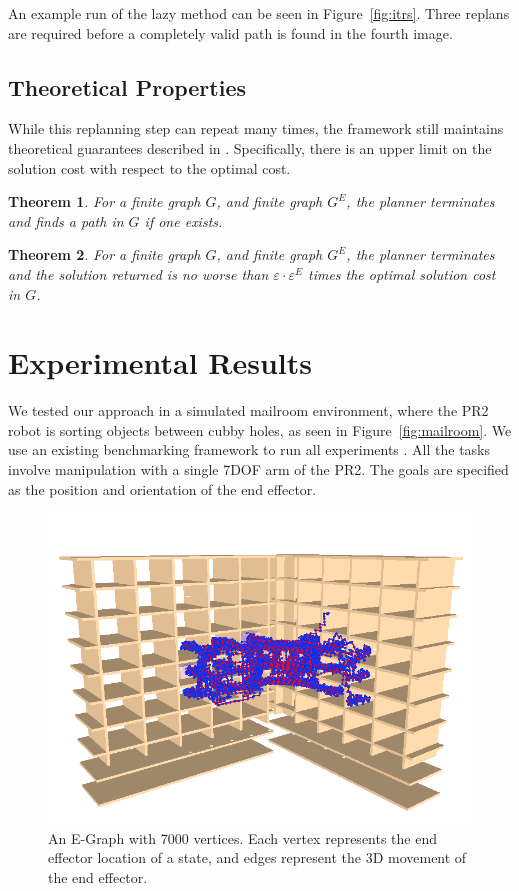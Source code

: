 \documentclass[letterpaper, 10 pt, conference]{ieeeconf}  %
\newtheorem{theorem}{Theorem}
\newcommand{\figref}[1]{Figure~\ref{fig:#1}}
\newcommand{\figlab}[1]{\label{fig:#1}}
\newcommand{\eeg}{\varepsilon^{E}}
\begin{document}
An example run of the lazy method can be seen in \figref{itrs}. Three
replans are required before a completely valid path is found in the fourth
image.

\subsection{Theoretical Properties}
While this replanning step can repeat many times, the framework still maintains
theoretical guarantees described in \cite{PhillipsRSS:2012}. Specifically, there
is an upper limit on the solution cost with respect to the optimal cost. 

\begin{theorem}
    \textit{For a finite graph $G$, and finite graph $G^E$, the planner
    terminates and finds a path in $G$ if one exists. }
\end{theorem}

\begin{theorem}
    \textit{For a finite graph $G$, and finite graph $G^E$, the planner
terminates and the solution returned is no worse than $\varepsilon \cdot \eeg$  times
the optimal solution cost in $G$.}
\end{theorem}

\section{Experimental Results}

We tested our approach in a simulated mailroom environment, where the PR2 robot
is sorting objects between cubby holes, as seen in \figref{mailroom}. We use an
existing benchmarking framework to run all experiments \cite{cohen2012generic}.
All the tasks involve manipulation with a single 7DOF arm of the PR2. The goals
are specified as the position and orientation of the end effector.

\begin{figure}[H]
    \includegraphics[width=1\columnwidth]{egraph.png}
    \caption{An E-Graph with 7000 vertices. Each vertex represents the end
        effector location of a state, and edges represent the 3D movement of the
    end effector.}
    \figlab{egraph}
\end{figure}
\end{document}
